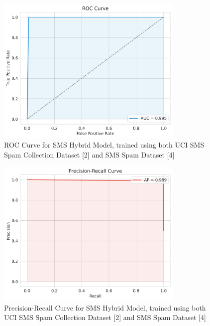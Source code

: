 \documentclass{article}
\begin{document}
\begin{figure}[htbp]
    \centering
    \includegraphics[width=0.8\textwidth]{../analysis/sms/hybrid/roc_curve.png}
    \caption{ROC Curve for SMS Hybrid Model, trained using both UCI SMS Spam Collection Dataset [2] and SMS Spam Dataset [4]}
    \label{fig:roc_curve_7}
\end{figure}

\begin{figure}[htbp]
    \centering
    \includegraphics[width=0.8\textwidth]{../analysis/sms/hybrid/precision_recall_curve.png}
    \caption{Precision-Recall Curve for SMS Hybrid Model, trained using both UCI SMS Spam Collection Dataset [2] and SMS Spam Dataset [4]}
    \label{fig:precision_recall_curve_7}
\end{figure}
\end{document}
